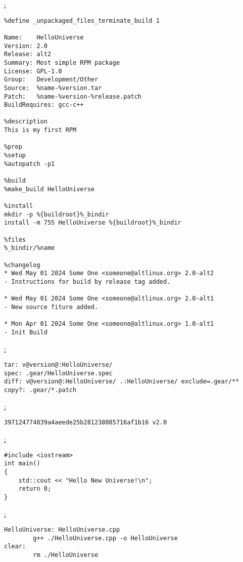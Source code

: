 \noindent\underline{:}
\begin{verbatim}
%define _unpackaged_files_terminate_build 1

Name:    HelloUniverse
Version: 2.0
Release: alt2
Summary: Most simple RPM package
License: GPL-1.0
Group:   Development/Other
Source:  %name-%version.tar
Patch:   %name-%version-%release.patch
BuildRequires: gcc-c++

%description
This is my first RPM

%prep
%setup
%autopatch -p1

%build
%make_build HelloUniverse

%install
mkdir -p %{buildroot}%_bindir
install -m 755 HelloUniverse %{buildroot}%_bindir

%files
%_bindir/%name

%changelog
* Wed May 01 2024 Some One <someone@altlinux.org> 2.0-alt2
- Instructions for build by release tag added.

* Wed May 01 2024 Some One <someone@altlinux.org> 2.0-alt1
- New source fiture added.

* Mon Apr 01 2024 Some One <someone@altlinux.org> 1.0-alt1
- Init Build

\end{verbatim}

\noindent\underline{:}
\begin{verbatim}
tar: v@version@:HelloUniverse/
spec: .gear/HelloUniverse.spec
diff: v@version@:HelloUniverse/ .:HelloUniverse/ exclude=.gear/**
copy?: .gear/*.patch

\end{verbatim}

\noindent\underline{:}
\begin{verbatim}
397124774839a4aeede25b281238085716af1b16 v2.0

\end{verbatim}

\noindent\underline{:}
\begin{verbatim}
#include <iostream>
int main()
{
    std::cout << "Hello New Universe!\n";
    return 0;
}

\end{verbatim}

\noindent\underline{:}
\begin{verbatim}
HelloUniverse: HelloUniverse.cpp
        g++ ./HelloUniverse.cpp -o HelloUniverse
clear:
        rm ./HelloUniverse

\end{verbatim}


